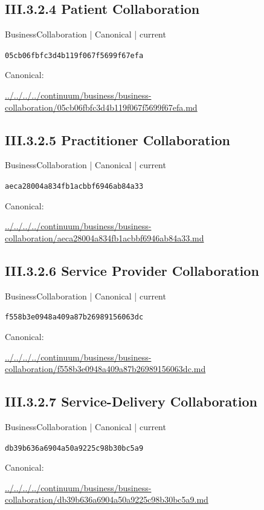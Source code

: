 \documentclass[10pt,a4paper]{article}
\begin{document}
\subsection*{III.3.2.4 Patient Collaboration}
\label{element-05cb06fbfc3d4b119f067f5699f67efa}
{\small BusinessCollaboration | Canonical | current}\par
\texttt{05cb06fbfc3d4b119f067f5699f67efa}\par
Canonical: \par
{\footnotesize\url{../../../../continuum/business/business-collaboration/05cb06fbfc3d4b119f067f5699f67efa.md}}\par
\subsection*{III.3.2.5 Practitioner Collaboration}
\label{element-aeca28004a834fb1acbbf6946ab84a33}
{\small BusinessCollaboration | Canonical | current}\par
\texttt{aeca28004a834fb1acbbf6946ab84a33}\par
Canonical: \par
{\footnotesize\url{../../../../continuum/business/business-collaboration/aeca28004a834fb1acbbf6946ab84a33.md}}\par
\subsection*{III.3.2.6 Service Provider Collaboration}
\label{element-f558b3e0948a409a87b26989156063dc}
{\small BusinessCollaboration | Canonical | current}\par
\texttt{f558b3e0948a409a87b26989156063dc}\par
Canonical: \par
{\footnotesize\url{../../../../continuum/business/business-collaboration/f558b3e0948a409a87b26989156063dc.md}}\par
\subsection*{III.3.2.7 Service-Delivery Collaboration}
\label{element-db39b636a6904a50a9225c98b30bc5a9}
{\small BusinessCollaboration | Canonical | current}\par
\texttt{db39b636a6904a50a9225c98b30bc5a9}\par
Canonical: \par
{\footnotesize\url{../../../../continuum/business/business-collaboration/db39b636a6904a50a9225c98b30bc5a9.md}}\par
\end{document}
